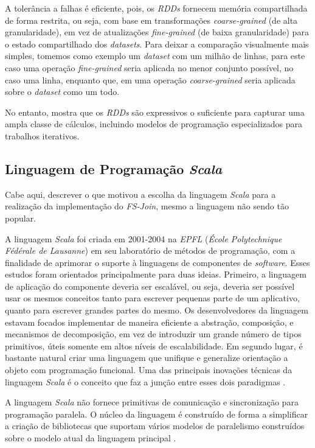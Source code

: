 A tolerância a falhas é eficiente, pois, os \textit{RDDs} fornecem memória compartilhada de forma restrita, ou seja, com base em transformações \textit{coarse-grained} (de alta granularidade), em vez de atualizações \textit{fine-grained} (de baixa granularidade) para o estado compartilhado dos \textit{datasets}. Para deixar a comparação visualmente mais simples, tomemos como exemplo um \textit{dataset} com um milhão de linhas, para este caso uma operação \textit{fine-grained} seria aplicada no menor conjunto possível, no caso uma linha, enquanto que, em uma operação \textit{coarse-grained} seria aplicada sobre o \textit{dataset} como um todo.

No entanto, \cite{Zaharia:2012:RDD} mostra que os \textit{RDDs} são expressivos o suficiente para capturar uma ampla classe de cálculos, incluindo modelos de programação especializados para trabalhos iterativos.

\subsection{Linguagem de Programação \textit{Scala}}

Cabe aqui, descrever o que motivou a escolha da linguagem \textit{Scala} para a realização da implementação do \textit{FS-Join}, mesmo a linguagem não sendo tão popular.

A linguagem \textit{Scala} foi criada em 2001-2004 na \textit{EPFL} (\textit{École Polytechnique Fédérale de Lausanne})  em seu laboratório de métodos de programação, com a finalidade de aprimorar o suporte à linguagens de componentes de \textit{software}. Esses estudos foram orientados principalmente para duas ideias. Primeiro, a linguagem de aplicação do componente deveria ser escalável, ou seja, deveria ser possível usar os mesmos conceitos tanto para escrever pequenas parte de um aplicativo, quanto para escrever grandes partes do mesmo. Os desenvolvedores da linguagem estavam focados implementar de maneira eficiente a abstração, composição, e mecanismos de decomposição, em vez de introduzir um grande número de tipos primitivos, úteis somente em altos níveis de escalabilidade. Em segundo lugar, é bastante natural criar uma linguagem que unifique e generalize orientação a objeto com programação funcional. Uma das principais inovações técnicas da linguagem \textit{Scala} é o conceito que faz a junção entre esses dois paradigmas \cite{Glybovets2010}.

A linguagem \textit{Scala} não fornece primitivas de comunicação e
sincronização para programação paralela. O núcleo da linguagem é construído de forma a simplificar a criação de bibliotecas que suportam vários modelos de paralelismo construídos sobre o modelo atual da linguagem principal \cite{Glybovets2010}.

